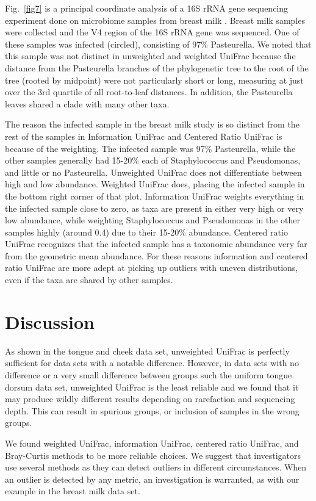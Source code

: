 \documentclass[10pt,letterpaper]{article}
\begin{document}
Fig.~\ref{fig7} is a principal coordinate analysis of a 16S rRNA gene sequencing experiment done on microbiome samples from breast milk \cite{urbaniak2016human}. Breast milk samples were collected and the V4 region of the 16S rRNA gene was sequenced. One of these samples was infected (circled), consisting of 97\% Pasteurella. We noted that this sample was not distinct in unweighted and weighted UniFrac because the distance from the Pasteurella branches of the phylogenetic tree to the root of the tree (rooted by midpoint) were not particularly short or long, measuring at just over the 3rd quartile of all root-to-leaf distances. In addition, the Pasteurella leaves shared a clade with many other taxa.

The reason the infected sample in the breast milk study is so distinct from the rest of the samples in Information UniFrac and Centered Ratio UniFrac is because of the weighting. The infected sample was 97\% Pasteurella, while the other samples generally had 15-20\% each of Staphylococcus and Pseudomonas, and little or no Pasteurella. Unweighted UniFrac does not differentiate between high and low abundance. Weighted UniFrac does, placing the infected sample in the bottom right corner of that plot. Information UniFrac weights everything in the infected sample close to zero, as taxa are present in either very high or very low abundance, while weighting Staphylococcus and Pseudomonas in the other samples highly (around 0.4) due to their 15-20\% abundance. Centered ratio UniFrac recognizes that the infected sample has a taxonomic abundance very far from the geometric mean abundance. For these reasons information and centered ratio UniFrac are more adept at picking up outliers with uneven distributions, even if the taxa are shared by other samples.

\section*{Discussion}
As shown in the tongue and cheek data set, unweighted UniFrac is perfectly sufficient for data sets with a notable difference. However, in data sets with no difference or a very small difference between groups such the uniform tongue dorsum data set, unweighted UniFrac is the least reliable and we found that it may produce wildly different results depending on rarefaction and sequencing depth. This can result in spurious groups, or inclusion of samples in the wrong groups.

We found weighted UniFrac, information UniFrac, centered ratio UniFrac, and Bray-Curtis methods to be more reliable choices. We suggest that investigators use several methods as they can detect outliers in different circumstances. When an outlier is detected by any metric, an investigation is warranted, as with our example in the breast milk data set.
\end{document}
